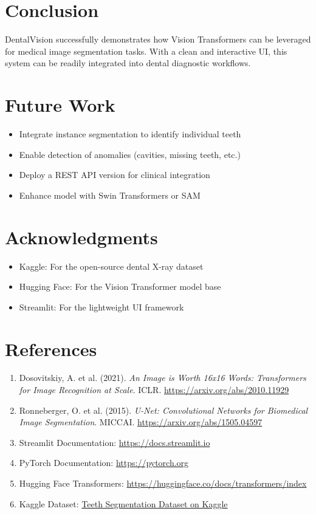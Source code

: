 \documentclass[12pt]{article}
\begin{document}
\section{Conclusion}
DentalVision successfully demonstrates how Vision Transformers can be leveraged for medical image segmentation tasks. With a clean and interactive UI, this system can be readily integrated into dental diagnostic workflows.

\section{Future Work}
\begin{itemize}
  \item Integrate instance segmentation to identify individual teeth
  \item Enable detection of anomalies (cavities, missing teeth, etc.)
  \item Deploy a REST API version for clinical integration
  \item Enhance model with Swin Transformers or SAM
\end{itemize}

\section{Acknowledgments}
\begin{itemize}
  \item Kaggle: For the open-source dental X-ray dataset
  \item Hugging Face: For the Vision Transformer model base
  \item Streamlit: For the lightweight UI framework
\end{itemize}

\section{References}
\begin{enumerate}
  \item Dosovitskiy, A. et al. (2021). \textit{An Image is Worth 16x16 Words: Transformers for Image Recognition at Scale}. ICLR. \url{https://arxiv.org/abs/2010.11929}
  \item Ronneberger, O. et al. (2015). \textit{U-Net: Convolutional Networks for Biomedical Image Segmentation}. MICCAI. \url{https://arxiv.org/abs/1505.04597}
  \item Streamlit Documentation: \url{https://docs.streamlit.io}
  \item PyTorch Documentation: \url{https://pytorch.org}
  \item Hugging Face Transformers: \url{https://huggingface.co/docs/transformers/index}
  \item Kaggle Dataset: \href{https://www.kaggle.com/datasets/humansintheloop/teeth-segmentation-on-dental-x-ray-images}{Teeth Segmentation Dataset on Kaggle}
\end{enumerate}
\end{document}
